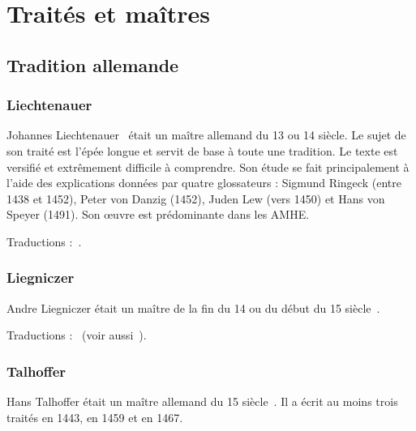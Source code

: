 \chapter{Traités et maîtres}


\section{Tradition allemande}


\subsection{Liechtenauer}
\label{app:maitres:liechtenauer}

Johannes Liechtenauer~\cite{wiktenauer:liechtenauer} était un maître allemand du 13\ieme{} ou 14\ieme{} siècle.
Le sujet de son traité est l'épée longue et servit de base à toute une tradition.
Le texte est versifié et extrêmement difficile à comprendre.
Son étude se fait principalement à l'aide des explications données par quatre glossateurs : Sigmund Ringeck (entre 1438 et 1452), Peter von Danzig (1452), Juden Lew (vers 1450) et Hans von Speyer (1491).
Son œuvre est prédominante dans les AMHE.

Traductions :~\cite{ardamhe:tetraptyque, farrell:ringeck, lindholm:ringeck:2008}.


\subsection{Liegniczer}
\label{app:maitres:liegniczer}

Andre Liegniczer était un maître de la fin du 14\ieme{} ou du début du 15\ieme{} siècle~\cite{wiktenauer:liegniczer}.

Traductions :~\cite{ardamhe:liegniczer, lindholm:ringeck_others:2006} (voir aussi~\cite{youtube:sala_armi:liegniczer, youtube:memag:liegniczer}).


\subsection{Talhoffer}
\label{app:maitres:talhoffer}

Hans Talhoffer était un maître allemand du 15\ieme{} siècle~\cite{wiktenauer:talhoffer}.
Il a écrit au moins trois traités en 1443, en 1459 et en 1467.

